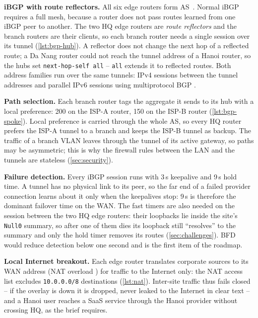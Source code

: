 
\textbf{iBGP with route reflectors.} All six edge routers form AS~\FactAsTvi{}. Normal iBGP requires a full
mesh, because a router does not pass routes learned from one iBGP peer to another. The two HQ edge routers
are \emph{route reflectors} \cite{rfc4456} and the branch routers are their clients, so each branch router
needs a single session over its tunnel (\cref{lst:bgp-hub}). A reflector does not change the next hop of a
reflected route; a Da Nang router could not reach the tunnel address of a Hanoi router, so the hubs set
\texttt{next-hop-self all} -- \texttt{all} extends it to reflected routes. Both address families run over
the same tunnels: IPv4 sessions between the tunnel addresses and parallel IPv6 sessions using
multiprotocol BGP \cite{rfc4760}.


\textbf{Path selection.} Each branch router tags the aggregate it sends to its hub with a local preference:
200 on the ISP-A router, 150 on the ISP-B router (\cref{lst:bgp-spoke}). Local preference is carried
through the whole AS, so every HQ router prefers the ISP-A tunnel to a branch and keeps the ISP-B tunnel as
backup. The traffic of a branch VLAN leaves through the tunnel of its active gateway, so paths may be
asymmetric; this is why the firewall rules between the LAN and the tunnels are stateless
(\cref{sec:security}).


\textbf{Failure detection.} Every iBGP session runs with 3\,s keepalive and 9\,s hold time. A tunnel has no
physical link to its peer, so the far end of a failed provider connection learns about it only when the
keepalives stop: 9\,s is therefore the dominant failover time on the WAN. The fast timers are also needed
on the session between the two HQ edge routers: their loopbacks lie inside the site's \texttt{Null0}
summary, so after one of them dies its loopback still ``resolves'' to the summary and only the hold timer
removes its routes (\cref{sec:challenges}). BFD \cite{rfc5880} would reduce detection below one second and is
the first item of the roadmap.

\textbf{Local Internet breakout.} Each edge router translates corporate sources to its WAN address (NAT
overload \cite{rfc3022}) for traffic to the Internet only: the NAT access list excludes
\texttt{10.0.0.0/8} destinations (\cref{lst:nat}). Inter-site traffic thus fails closed -- if the overlay
is down it is dropped, never leaked to the Internet in clear text -- and a Hanoi user reaches a SaaS service
through the Hanoi provider without crossing HQ, as the brief requires.

